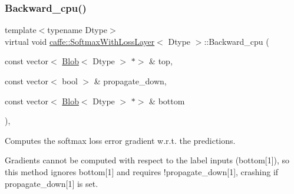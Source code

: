 \subsubsection{\texorpdfstring{Backward\+\_\+cpu()}{Backward\_cpu()}\hspace{0.1cm}{\footnotesize\ttfamily [2/2]}}
{\footnotesize\ttfamily template$<$typename Dtype$>$ \\
virtual void \mbox{\hyperlink{classcaffe_1_1_softmax_with_loss_layer}{caffe\+::\+Softmax\+With\+Loss\+Layer}}$<$ Dtype $>$\+::Backward\+\_\+cpu (\begin{DoxyParamCaption}\item[{const vector$<$ \mbox{\hyperlink{classcaffe_1_1_blob}{Blob}}$<$ Dtype $>$ $\ast$$>$ \&}]{top,  }\item[{const vector$<$ bool $>$ \&}]{propagate\+\_\+down,  }\item[{const vector$<$ \mbox{\hyperlink{classcaffe_1_1_blob}{Blob}}$<$ Dtype $>$ $\ast$$>$ \&}]{bottom }\end{DoxyParamCaption})\hspace{0.3cm}{\ttfamily [protected]}, {\ttfamily [virtual]}}



Computes the softmax loss error gradient w.\+r.\+t. the predictions. 

Gradients cannot be computed with respect to the label inputs (bottom\mbox{[}1\mbox{]}), so this method ignores bottom\mbox{[}1\mbox{]} and requires !propagate\+\_\+down\mbox{[}1\mbox{]}, crashing if propagate\+\_\+down\mbox{[}1\mbox{]} is set.



